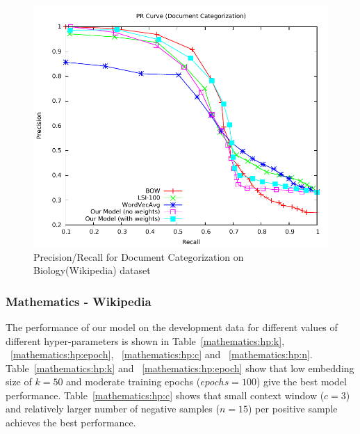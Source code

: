 \begin{figure}[tb]
\centering
        \includegraphics[width=0.8\columnwidth]{figs/pr/biology-cs-scala.pdf}
        \vskip -4mm
    \caption{\footnotesize Precision/Recall for Document Categorization on Biology(Wikipedia) dataset}
    \label{fig:pr:biology:cs} 
\end{figure}

\subsubsection{Mathematics - Wikipedia}
The performance of our model on the development data for different values of different hyper-parameters is shown in Table~\ref{mathematics:hp:k}, ~\ref{mathematics:hp:epoch}, ~\ref{mathematics:hp:c} and ~\ref{mathematics:hp:n}. Table~\ref{mathematics:hp:k} and ~\ref{mathematics:hp:epoch} show that low embedding size of $k = 50$ and moderate training epochs ($epochs = 100$) give the best model performance. 
Table~\ref{mathematics:hp:c} shows that small context window ($c = 3$) and relatively larger number of negative samples ($n = 15$) per positive sample achieves the best performance.

